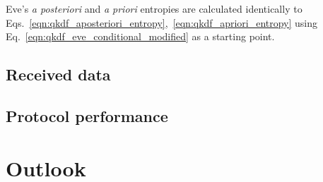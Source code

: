 Eve's \emph{a posteriori} and \emph{a priori} entropies are calculated identically to Eqs.~\ref{eqn:qkdf_aposteriori_entropy},~\ref{eqn:qkdf_apriori_entropy} using Eq.~\ref{eqn:qkdf_eve_conditional_modified} as a starting point.



\subsection{Received data}\label{sec:aqc_received_data}

\subsection{Protocol performance}


\section{Outlook}

